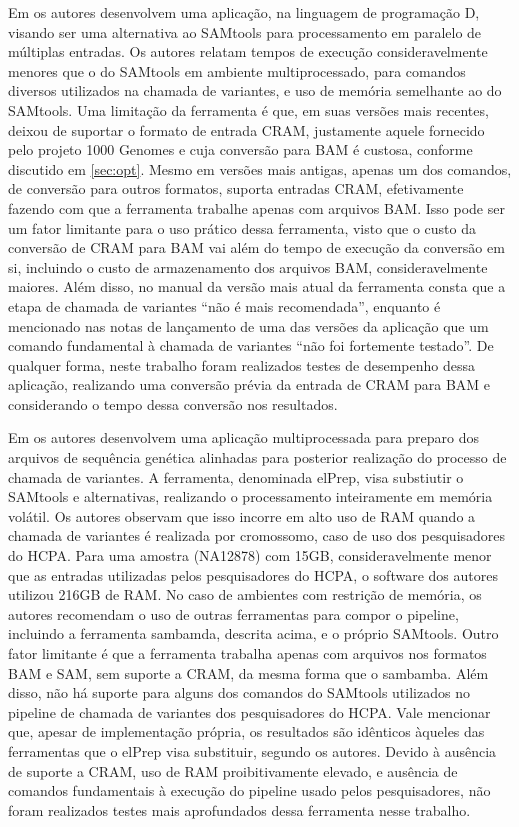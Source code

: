 \documentclass[cic,tc]{iiufrgs}
\begin{document}
Em \cite{tarasov2015sambamba} os autores desenvolvem uma aplicação, na
linguagem de programação D, visando ser uma alternativa ao SAMtools para
processamento em paralelo de múltiplas entradas. Os autores relatam tempos de
execução consideravelmente menores que o do SAMtools em ambiente
multiprocessado, para comandos diversos utilizados na chamada de variantes, e
uso de memória semelhante ao do SAMtools. Uma limitação da ferramenta é que, em
suas versões mais recentes, deixou de suportar o formato de entrada CRAM,
justamente aquele fornecido pelo projeto 1000 Genomes e cuja conversão para BAM é
custosa, conforme discutido em \ref{sec:opt}. Mesmo em versões mais antigas,
apenas um dos comandos, de conversão para outros formatos, suporta entradas
CRAM, efetivamente fazendo com que a ferramenta trabalhe apenas com arquivos
BAM. Isso pode ser um fator limitante para o uso prático dessa ferramenta,
visto que o custo da conversão de CRAM para BAM vai além do tempo de execução
da conversão em si, incluindo o custo de armazenamento dos arquivos BAM,
consideravelmente maiores. Além disso, no manual da versão mais atual da
ferramenta consta que a etapa de chamada de variantes ``não é mais
recomendada'', enquanto é mencionado nas notas de lançamento de uma das versões
da aplicação que um comando fundamental à chamada de variantes ``não
foi fortemente testado''.\cite{manual2015sambamba} De qualquer forma, neste
trabalho foram realizados testes de desempenho dessa aplicação, realizando uma
conversão prévia da entrada de CRAM para BAM e considerando o tempo dessa
conversão nos resultados.

Em \cite{herzeel2015elprep} os autores desenvolvem uma aplicação
multiprocessada para preparo dos arquivos de sequência genética alinhadas para
posterior realização do processo de chamada de variantes. A ferramenta,
denominada elPrep, visa substiutir o SAMtools e alternativas, realizando o
processamento inteiramente em memória volátil. Os autores observam que isso
incorre em alto uso de RAM quando a chamada de variantes é realizada por
cromossomo, caso de uso dos pesquisadores do HCPA. Para uma amostra (NA12878)
com 15GB, consideravelmente menor que as entradas utilizadas pelos
pesquisadores do HCPA, o software dos autores utilizou 216GB de RAM. No caso de
ambientes com restrição de memória, os autores recomendam o uso de outras
ferramentas para compor o pipeline, incluindo a ferramenta sambamda, descrita
acima, e o próprio SAMtools. Outro fator limitante é que a ferramenta trabalha
apenas com arquivos nos formatos BAM e SAM, sem suporte a CRAM, da mesma forma
que o sambamba. Além disso, não há suporte para alguns dos comandos do
SAMtools utilizados no pipeline de chamada de variantes dos pesquisadores do
HCPA. Vale mencionar que, apesar de implementação própria, os resultados são
idênticos àqueles das ferramentas que o elPrep visa substituir, segundo os
autores. Devido à ausência de suporte a CRAM, uso de RAM proibitivamente
elevado, e ausência de comandos fundamentais à execução do pipeline usado pelos
pesquisadores, não foram realizados testes mais aprofundados dessa ferramenta
nesse trabalho.
\end{document}
